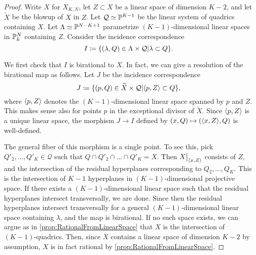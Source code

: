 \begin{proof}
  Write $X$ for $X_{K,N}$, let $Z \subset X$ be a linear space of dimension $K-2$, and let $\widetilde{X}$ be the blowup of $X$ in $Z$.  Let $\mathcal{Q} \simeq \P^{K-1}$ be the linear system of quadrics containing $X$. Let $\Lambda \simeq \P^{N-K+1}$ parametrize $(K-1)$-dimensional linear spaces in $\P_k^N$ containing $Z$. Consider the incidence correspondence
\[ I \coloneqq \set{(\lambda,Q) \in \Lambda \times \mathcal{Q} \vert \lambda \subset Q}. \]

We first check that $I$ is birational to $X$. In fact, we can give a resolution of the birational map as follows. Let $J$ be the incidence correspondence
\[ J \coloneqq \set{(p,Q) \in \widetilde{X} \times \mathcal{Q} \vert \ip{p,Z} \subset Q}, \]
where $\ip{p,Z}$ denotes the $(K-1)$-dimensional linear space spanned by $p$ and $Z$. This makes sense also for points $p$ in the exceptional divisor of $\widetilde{X}$. Since $\ip{p,Z}$ is a unique linear space, the morphism $J \to I$ defined by $(x,Q) \mapsto (\ip{x,Z},Q)$ is well-defined.

The general fiber of this morphism is a single point. To see this, pick $Q'_2,\dots,Q'_K \in \mathcal{Q}$ such that $Q\cap Q'_2\cap \dots \cap Q'_K = X$. Then $\restr{X}{\ip{x,Z}}$ consists of $Z$, and the intersection of the residual hyperplanes corresponding to $Q_2,\dots,Q_{K}$. This is the intersection of $K-1$ hyperplanes in $(K-1)$-dimensional projective space. If there exists a $(K-1)$-dimensional linear space such that the residual hyperplanes intersect transversally, we are done. Since then the residual hyperplanes intersect transversally for a general $(K-1)$-dimensional linear space containing $\lambda$, and the map is birational. If no such space exists, we can argue as in \cref{prop:RationalFromLinearSpace} that $X$ is the intersection of $(K-1)$-quadrics. Then, since $X$ contains a linear space of dimension $K-2$ by assumption, $X$ is in fact rational by \cref{prop:RationalFromLinearSpace}.


\end{proof}

